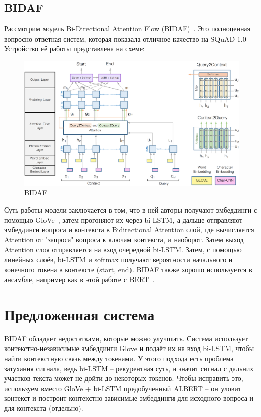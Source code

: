 \documentclass{article}
\begin{document}
\subsection{BIDAF}

Рассмотрим модель Bi-Directional Attention Flow (BIDAF)~\cite{BIDAF}. Это полноценная вопросно-ответная систем, которая показала отличное качество на SQuAD 1.0~\cite{SQuADfirst}
Устройство её работы представлена на схеме:

\begin{figure}[!ht]
    \centering
    \includegraphics[width=150mm]{../figures/BIDAF.png}
    \caption{BIDAF}
    \label{fig:bidaf}
\end{figure}

Суть работы модели заключается в том, что в ней авторы получают эмбеддинги с помощью GloVe~\cite{glove}, затем прогоняют их через bi-LSTM, а дальше отправляют эмбеддинги вопроса и контекста в Bidirectional Attention слой, где вычисляется Attention от "запроса" вопроса к ключам контекста, и наоборот. Затем выход Attention слоя отправляется на вход очередной bi-LSTM. Затем, с помощью линейных слоёв, bi-LSTM и softmax получают вероятности начального и конечного токена в контексте (start, end).
BIDAF также хорошо используется в ансамбле, например как в этой работе с BERT~\cite{BERTbidaf}.

\section{Предложенная система}

BIDAF обладает недостатками, которые можно улучшить. Система использует контекстно-независимые эмбеддинги Glove и подаёт их на вход bi-LSTM, чтобы найти контекстную связь между токенами. У этого подхода есть проблема затухания сигнала, ведь bi-LSTM -- рекурентная суть, а значит сигнал с дальних участков текста может не дойти до некоторых токенов. Чтобы исправить это, используем вместо GloVe + bi-LSTM предобученный ALBERT -- он уловит контекст и построит контекстно-зависимые эмбеддинги для исходного вопроса и для контекста (отдельно).
\end{document}
